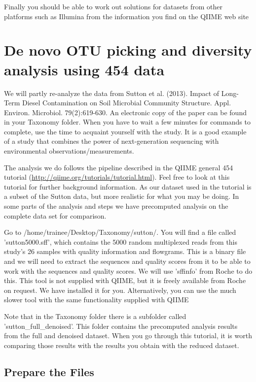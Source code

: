 Finally you should be able to work out solutions for datasets from other platforms such as Illumina from the information you find on the QIIME web site

\section{De novo OTU picking and diversity analysis using 454 data}

We will partly re-analyze the data from Sutton et al. (2013). Impact of Long-Term Diesel Contamination on Soil Microbial Community Structure. Appl. Environ. Microbiol. 79(2):619-630. An electronic copy of the paper can be found in your Taxonomy folder. When you have to wait a few minutes for commands to complete, use the time to acquaint yourself with the study. It is a good example of a study that combines the power of next-generation sequencing with environmental observations/measurements.

The analysis we do follows the pipeline described in the QIIME general 454 tutorial (\url{http://qiime.org/tutorials/tutorial.html}). Feel free to look at this tutorial for further background information. As our dataset used in the tutorial is a subset of the Sutton data, but more realistic for what you may be doing. In some parts of the analysis and steps we have precomputed analysis on the complete data set for comparison.

Go to /home/trainee/Desktop/Taxonomy/sutton/. You will find a file called 'sutton5000.sff', which contains the 5000 random multiplexed reads from this study's 26 samples with quality information and flowgrams. This is a binary file and we will need to extract the sequences and quality scores from it to be able to work with the sequences and quality scores. We will use 'sffinfo' from Roche to do this. This tool is not supplied with QIIME, but it is freely available from Roche on request. We have installed it for you. Alternatively, you can use the much slower tool with the same functionality supplied with QIIME

Note that in the Taxonomy folder there is a subfolder called 'sutton\_full\_denoised'. This folder contains the precomputed analysis results from the full and denoised dataset. When you go through this tutorial, it is worth comparing those results with the results you obtain with the reduced dataset. 

\subsection{Prepare the Files}

